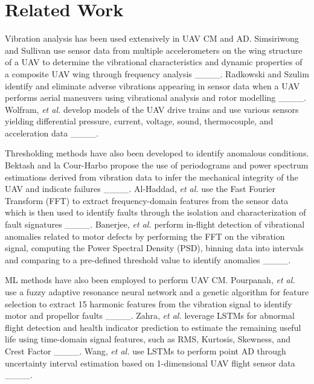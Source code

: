 \section{Related Work}
Vibration analysis has been used extensively in UAV CM and AD. Simsiriwong and Sullivan use sensor data from multiple accelerometers on the wing structure of a UAV to determine the vibrational characteristics and dynamic properties of a composite UAV wing through frequency analysis ____. Radkowski and Szulim identify and eliminate adverse vibrations appearing in sensor data when a UAV performs aerial maneuvers using vibrational analysis and rotor modelling ____. Wolfram, \textit{et al.} develop models of the UAV drive trains and use various sensors yielding differential pressure, current, voltage, sound, thermocouple, and acceleration data ____. \par
Thresholding methods have also been developed to identify anomalous conditions. Bektash and la Cour-Harbo propose the use of periodograms and power spectrum estimations derived from vibration data to infer the mechanical integrity of the UAV and indicate failures ____. Al-Haddad, \textit{et al.} use the Fast Fourier Transform (FFT) to extract frequency-domain features from the sensor data which is then used to identify faults through the isolation and characterization of fault signatures ____. Banerjee, \textit{et al.} perform in-flight detection of vibrational anomalies related to motor defects by performing the FFT on the vibration signal, computing the Power Spectral Density (PSD), binning data into intervals and comparing to a pre-defined threshold value to identify anomalies ____. \par
ML methods have also been employed to perform UAV CM. Pourpanah, \textit{et al.} use a fuzzy adaptive resonance neural network and a genetic algorithm for feature selection to extract 15 harmonic features from the vibration signal to identify motor and propellor faults ____. Zahra, \textit{et al.} leverage LSTMs for abnormal flight detection and health indicator prediction to estimate the remaining useful life using time-domain signal features, such as RMS, Kurtosis, Skewness, and Crest Factor ____. Wang, \textit{et al.}  use LSTMs to perform point AD through uncertainty interval estimation based on 1-dimensional UAV flight sensor data ____.

